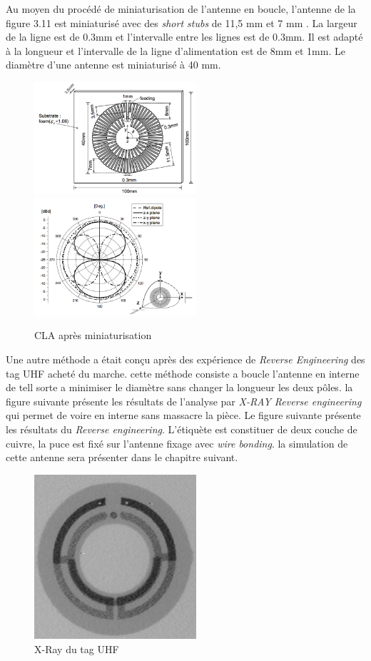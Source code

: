 \documentclass[11pt, a4paper, twoside]{book}
\begin{document}
Au moyen du procédé de miniaturisation de l'antenne en boucle, l'antenne de la figure 3.11 est miniaturisé avec des \emph{short stubs} de 11,5 mm et 7 mm . La largeur de la ligne est de 0.3mm et l'intervalle entre les lignes est de 0.3mm. Il est adapté à la longueur et l'intervalle de la ligne d'alimentation est de 8mm et 1mm. Le diamètre d'une antenne est miniaturisé à 40 mm.\\
\begin{figure}[H]
\centering
\includegraphics[width=6cm]{structure}
\includegraphics[width=6cm]{structurea}
\caption{CLA après miniaturisation}
\end{figure}

Une autre méthode a était conçu après des expérience de \emph{Reverse Engineering} des tag UHF acheté du marche. cette méthode consiste a boucle l'antenne en interne de tell sorte a minimiser le diamètre sans changer la longueur les deux pôles. la figure suivante présente les résultats de l'analyse par  \emph{X-RAY Reverse engineering} qui permet de voire en interne sans massacre la pièce. Le figure suivante présente les résultats du \emph{Reverse engineering}. L'étiquète est constituer de deux couche de cuivre, la puce est fixé sur l'antenne fixage avec \emph{wire bonding}. la simulation de cette antenne sera présenter dans le chapitre suivant. \\

\begin{figure}[H]
\centering
\includegraphics[width=6cm]{xray}
\caption{X-Ray du tag UHF}
\end{figure}
\end{document}
